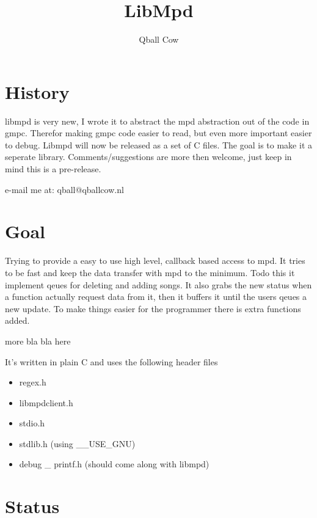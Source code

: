 \documentclass[a4paper,11pt]{article}
\begin{document}
\title{LibMpd} 
\author{Qball Cow}
\maketitle

\section{History}

libmpd is very new, I wrote it to abstract the mpd abstraction out of the code
in gmpc. Therefor making gmpc code easier to read, but even more important
easier to debug. Libmpd will now be released as a set of C files. The goal is
to make it a seperate library. Comments/suggestions are more then welcome,
just keep in mind this is a pre-release.

e-mail me at: qball@qballcow.nl

\section{Goal}

Trying to provide a easy to use high level, callback based access to mpd. It
tries to be fast and keep the data transfer with mpd to the minimum. 
Todo this it implement qeues for deleting and adding songs. It also grabs the new status when a function actually request data from it, then it buffers it until the users qeues a new update. To make things easier for the programmer there is extra functions added.

{\color{red} more bla bla here}

It's written in plain C and uses the following header files
\begin{itemize}
  \item regex.h
  
  \item libmpdclient.h
  
  \item stdio.h
  
  \item stdlib.h (using  \_\_USE\_GNU)
  
  \item debug \_ printf.h (should come along with libmpd)
\end{itemize}

\section{Status}
\end{document}
